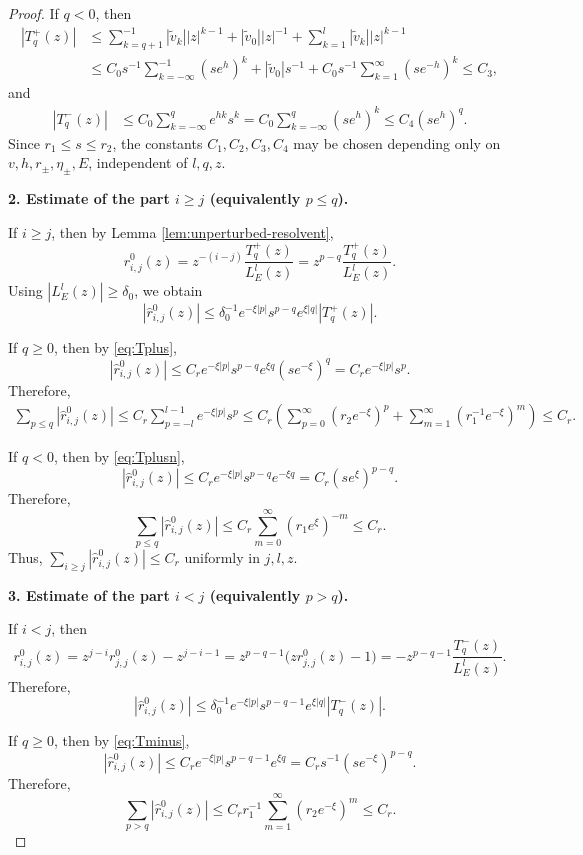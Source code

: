 \documentclass[reqno,11pt]{amsart}
\begin{document}
\begin{proof}
If $q<0$, then
\begin{align}
|T_q^+(z)| &\le \sum_{k=q+1}^{-1}|\widetilde v_k||z|^{k-1} +|\widetilde v_0||z|^{-1} +\sum_{k=1}^{l}|\widetilde v_k||z|^{k-1} \nonumber\\
&\le C_0 s^{-1}\sum_{k=-\infty}^{-1}(s e^h)^k +|\widetilde v_0|s^{-1} +C_0 s^{-1}\sum_{k=1}^{\infty}(s e^{-h})^k \le C_3 ,
\label{eq:Tplusn}
\end{align}
and
\begin{align}
|T_q^-(z)| &\le C_0\sum_{k=-\infty}^{q} e^{h k}s^k = C_0\sum_{k=-\infty}^{q}(s e^h)^k \le C_4(s e^h)^q .
\label{eq:Tminusn}
\end{align}
Since $r_1\le s\le r_2$, the constants $C_1,C_2,C_3,C_4$ may be chosen depending only on $v,h,r_\pm,\eta_\pm,E$, independent of $l,q,z$.

\textbf{2. Estimate of the part $i\ge j$ (equivalently $p\le q$).}

If $i\ge j$, then by Lemma \ref{lem:unperturbed-resolvent},
$$
r_{i,j}^0(z) = z^{-(i-j)}\frac{T_q^+(z)}{L^{l}_{E}(z)} = z^{p-q}\frac{T_q^+(z)}{L^{l}_{E}(z)}.
$$
Using $|L^{l}_{E}(z)|\ge \delta_0$, we obtain
$$
|\widehat r_{i,j}^0(z)| \le \delta_0^{-1}e^{-\xi|p|}s^{p-q}e^{\xi|q|}|T_q^+(z)|.
$$

If $q\ge 0$, then by \eqref{eq:Tplus},
$$
|\widehat r_{i,j}^0(z)| \le C_r e^{-\xi|p|}s^{p-q}e^{\xi q}(s e^{-\xi})^q = C_r e^{-\xi|p|}s^p.
$$
Therefore,
\begin{align*}
\sum_{p\le q} |\widehat r_{i,j}^0(z)| \le C_r\sum_{p=-l}^{l-1} e^{-\xi|p|}s^p \le C_r\left( \sum_{p=0}^{\infty}(r_2e^{-\xi})^p + \sum_{m=1}^{\infty}(r_1^{-1}e^{-\xi})^m \right) \le C_r.
\end{align*}

If $q<0$, then by \eqref{eq:Tplusn},
$$
|\widehat r_{i,j}^0(z)| \le C_r e^{-\xi|p|}s^{p-q}e^{-\xi q} = C_r(se^\xi)^{p-q}.
$$
Therefore,
$$
\sum_{p\le q} |\widehat r_{i,j}^0(z)| \le C_r\sum_{m=0}^{\infty}(r_1e^\xi)^{-m} \le C_r.
$$
Thus, $\sum_{i\ge j} |\widehat r_{i,j}^0(z)|\le C_r$ uniformly in $j,l,z$.

\textbf{3. Estimate of the part $i<j$ (equivalently $p>q$).}

If $i<j$, then
$$
r_{i,j}^0(z) = z^{j-i}r_{j,j}^0(z)-z^{j-i-1} = z^{p-q-1}\bigl(zr_{j,j}^0(z)-1\bigr) = -z^{p-q-1}\frac{T_q^-(z)}{L^{l}_{E}(z)}.
$$
Therefore,
$$
|\widehat r_{i,j}^0(z)| \le \delta_0^{-1}e^{-\xi|p|}s^{p-q-1}e^{\xi|q|}|T_q^-(z)|.
$$

If $q\ge 0$, then by \eqref{eq:Tminus},
$$
|\widehat r_{i,j}^0(z)| \le C_r e^{-\xi|p|}s^{p-q-1}e^{\xi q} = C_r s^{-1}(s e^{-\xi})^{p-q}.
$$
Therefore,
$$
\sum_{p>q} |\widehat r_{i,j}^0(z)| \le C_r r_1^{-1}\sum_{m=1}^{\infty}(r_2e^{-\xi})^m \le C_r.
$$


\end{proof}
\end{document}
